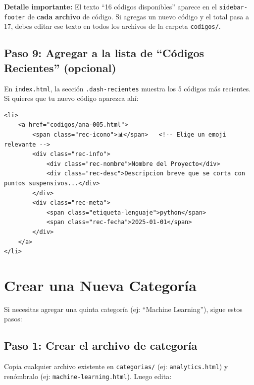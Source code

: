 \documentclass[12pt, a4paper]{article}
\newcommand{\archivo}[1]{\texttt{\textcolor{cpAccent}{#1}}}
\newcommand{\clase}[1]{\texttt{\textcolor{cpAzul}{.#1}}}
\begin{document}
\begin{cajaAviso}
    \textbf{Detalle importante:} El texto ``16 códigos disponibles'' aparece
    en el \texttt{sidebar-footer} de \textbf{cada archivo} de código. Si
    agregas un nuevo código y el total pasa a 17, debes editar ese texto
    en todos los archivos de la carpeta \archivo{codigos/}.
\end{cajaAviso}

\subsection{Paso 9: Agregar a la lista de ``Códigos Recientes'' (opcional)}

En \archivo{index.html}, la sección \clase{dash-recientes} muestra los 5 códigos
más recientes. Si quieres que tu nuevo código aparezca ahí:

\begin{lstlisting}[style=htmlstyle, caption={Agregar entrada a Códigos Recientes en index.html}]
<li>
    <a href="codigos/ana-005.html">
        <span class="rec-icono">📊</span>   <!-- Elige un emoji relevante -->
        <div class="rec-info">
            <div class="rec-nombre">Nombre del Proyecto</div>
            <div class="rec-desc">Descripcion breve que se corta con puntos suspensivos...</div>
        </div>
        <div class="rec-meta">
            <span class="etiqueta-lenguaje">python</span>
            <span class="rec-fecha">2025-01-01</span>
        </div>
    </a>
</li>
\end{lstlisting}


\section{Crear una Nueva Categoría}

Si necesitas agregar una quinta categoría (ej: ``Machine Learning''), sigue
estos pasos:

\subsection{Paso 1: Crear el archivo de categoría}

Copia cualquier archivo existente en \archivo{categorias/} (ej: \archivo{analytics.html})
y renómbralo (ej: \archivo{machine-learning.html}). Luego edita:
\end{document}

